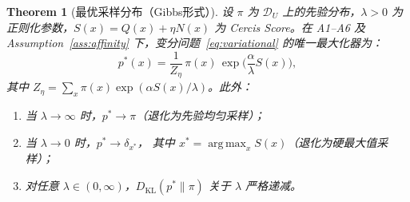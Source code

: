\documentclass[12pt,a4paper]{article}
\newtheorem{theorem}{Theorem}[section]
\newcommand{\cD}{\mathcal{D}}
\newcommand{\argmax}{\operatorname*{arg\,max}}
\newcommand{\KL}{D_{\mathrm{KL}}}
\begin{document}
\begin{theorem}[最优采样分布（Gibbs形式）]
\label{thm:optimal-dist}
设 $\pi$ 为 $\cD_U$ 上的先验分布，$\lambda>0$ 为正则化参数，$S(x)=Q(x)+\eta N(x)$ 为 Cercis Score。在 A1--A6 及 Assumption~\ref{ass:affinity} 下，变分问题~\eqref{eq:variational} 的唯一最大化器为：
\begin{equation}\label{eq:thm-dist}
    p^*(x) = \frac{1}{Z_\eta}\,
    \pi(x)\,\exp\!\Big(\frac{\alpha}{\lambda}S(x)\Big),
\end{equation}
其中 $Z_\eta=\sum_{x}\pi(x)\exp(\alpha S(x)/\lambda)$。此外：
\begin{enumerate}[label=(\roman*)]
    \item 当 $\lambda\to\infty$ 时，$p^*\to\pi$（退化为先验均匀采样）；
    \item 当 $\lambda\to0$ 时，$p^*\to\delta_{x^*}$，
          其中 $x^*=\argmax_x S(x)$（退化为硬最大值采样）；
    \item 对任意 $\lambda\in(0,\infty)$，$\KL(p^*\|\pi)$ 关于 $\lambda$ 严格递减。
\end{enumerate}
\end{theorem}
\end{document}
